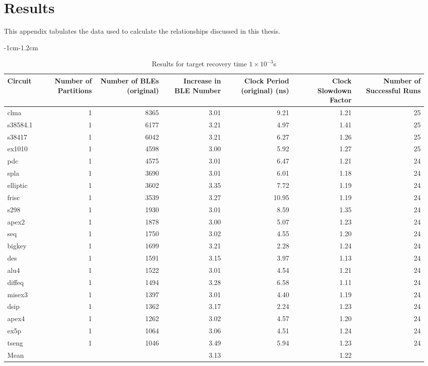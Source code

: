 \documentclass[12pt,final,oneside]{dwThesis} %
\begin{document}
   \appendix 
   \chapter{Results}
   This appendix tabulates the data used to
   calculate the relationships discussed in this thesis.


   \begin{table}
      \footnotesize 
      \begin{adjustwidth}
         {-1cm}{-1.2cm}

         \begin{tabularx}
            {1.1\textwidth}{lRRRRRR}
            \toprule
 Circuit & Number of Partitions &  Number of BLEs (original) &  Increase in BLE Number &  Clock Period (original) (ns) &  Clock Slowdown Factor &  Number of Successful Runs\\
 \midrule
clma & 1 & 8365 & 3.01 & 9.21 & 1.21 & 25\\
s38584.1 & 1 & 6177 & 3.21 & 4.97 & 1.41 & 25\\
s38417 & 1 & 6042 & 3.21 & 6.27 & 1.26 & 25\\
ex1010 & 1 & 4598 & 3.00 & 5.92 & 1.27 & 25\\
pdc & 1 & 4575 & 3.01 & 6.47 & 1.21 & 24\\
spla & 1 & 3690 & 3.01 & 6.01 & 1.18 & 24\\
elliptic & 1 & 3602 & 3.35 & 7.72 & 1.19 & 24\\
frisc & 1 & 3539 & 3.27 & 10.95 & 1.19 & 24\\
s298 & 1 & 1930 & 3.01 & 8.59 & 1.35 & 24\\
apex2 & 1 & 1878 & 3.00 & 5.07 & 1.23 & 24\\
seq & 1 & 1750 & 3.02 & 4.55 & 1.20 & 24\\
bigkey & 1 & 1699 & 3.21 & 2.28 & 1.24 & 24\\
des & 1 & 1591 & 3.15 & 3.97 & 1.13 & 24\\
alu4 & 1 & 1522 & 3.01 & 4.54 & 1.21 & 24\\
diffeq & 1 & 1494 & 3.28 & 6.58 & 1.11 & 24\\
misex3 & 1 & 1397 & 3.01 & 4.40 & 1.19 & 24\\
dsip & 1 & 1362 & 3.17 & 2.24 & 1.23 & 24\\
apex4 & 1 & 1262 & 3.02 & 4.57 & 1.20 & 24\\
ex5p & 1 & 1064 & 3.06 & 4.51 & 1.24 & 24\\
tseng & 1 & 1046 & 3.49 & 5.94 & 1.23 & 24\\
Mean &  &  & 3.13  &  & 1.22 & \\


            \bottomrule 
         \end{tabularx}
         \caption{Results
            for target recovery time $1\times10^{-3}$s} \label{Results1e-3}

      \end{adjustwidth}

   \end{table}
\end{document}
